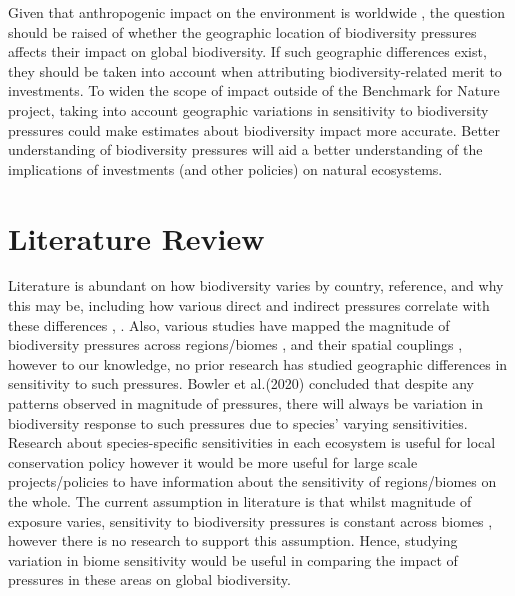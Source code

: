 \documentclass[11pt, a4paper, titlepage]{article}
\begin{document}
   	 Given that anthropogenic impact on the environment is worldwide \citep{plumptre2021might}, the question should be raised of whether the geographic location of biodiversity pressures affects their impact on global biodiversity. If such geographic differences exist, they should be taken into account when attributing biodiversity-related merit to investments. To widen the scope of impact outside of the Benchmark for Nature project, taking into account geographic variations in sensitivity to biodiversity pressures could make estimates about biodiversity impact more accurate. Better understanding of biodiversity pressures will aid a better understanding of the implications of investments (and other policies) on natural ecosystems. \newline
   	
   	\newpage
   	\section*{Literature Review}
   	
   	Literature is abundant on how biodiversity varies by country, {reference}, and why this may be, including how various direct and indirect pressures correlate with these differences \citep{sunday2015species}, \citep{ament2019compatibility} \citep{Velde2022}. 
	Also, various studies have mapped the magnitude of biodiversity pressures across regions/biomes \citep{millennium2005ecosystems} \citep{sala2000global}, and their spatial couplings \citep{bowler2020mapping}, however to our knowledge, no prior research has studied geographic differences in sensitivity to such pressures. Bowler et al.(2020) concluded that despite any patterns observed in magnitude of pressures, there will always be variation in biodiversity response to such pressures due to species' varying sensitivities. Research about species-specific sensitivities in each ecosystem is useful for local conservation policy however it would be more useful for large scale projects/policies to have information about the sensitivity of regions/biomes on the whole. The current assumption in literature is that whilst magnitude of exposure varies, sensitivity to biodiversity pressures is constant across biomes \citep{sala2000global}, however there is no research to support this assumption. Hence, studying variation in biome sensitivity would be useful in comparing the impact of pressures in these areas on global biodiversity.  \newline
	
\end{document}
